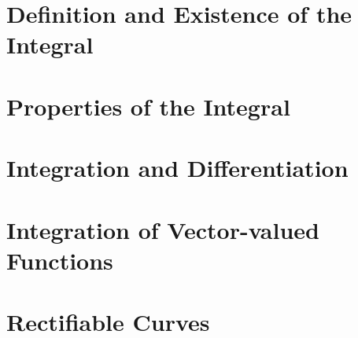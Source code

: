 
\section{Definition and Existence of the Integral}\label{sec:definition-and-existence-of-the-integral}


\section{Properties of the Integral}\label{sec:properties-of-the-integral}


\section{Integration and Differentiation}\label{sec:integration-and-differentiation}


\section{Integration of Vector-valued Functions}\label{sec:integration-of-vector-valued-functions}


\section{Rectifiable Curves}\label{sec:rectifiable-curves}

